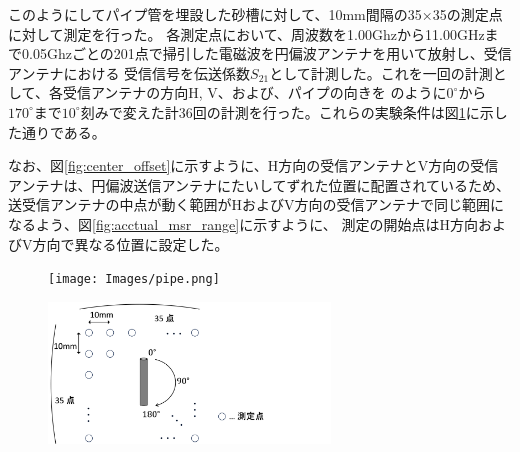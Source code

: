 \documentclass[11pt,a4paper,uplatex]{ujarticle}
\begin{document}
  このようにしてパイプ管を埋設した砂槽に対して、10mm間隔の35×35の測定点に対して測定を行った。
  各測定点において、周波数を1.00Ghzから11.00GHzまで0.05Ghzごとの201点で掃引した電磁波を円偏波アンテナを用いて放射し、受信アンテナにおける
  受信信号を伝送係数$S_{21}$として計測した。これを一回の計測として、各受信アンテナの方向H, V、および、パイプの向きを
  のように$0^{\circ}$から$170^{\circ}$まで$10^{\circ}$刻みで変えた計36回の計測を行った。これらの実験条件は図\ref{fig:msr_cond}に示した通りである。

  なお、図\ref{fig:center_offset}に示すように、H方向の受信アンテナとV方向の受信アンテナは、円偏波送信アンテナにたいしてずれた位置に配置されているため、
  送受信アンテナの中点が動く範囲がHおよびV方向の受信アンテナで同じ範囲になるよう、図\ref{fig:acctual_msr_range}に示すように、
  測定の開始点はH方向およびV方向で異なる位置に設定した。


  \begin{figure}[tbp]
    \begin{minipage}[b]{0.5\textwidth}
      \centering
      \texttt{[image: Images/pipe.png]}
      \label{fig:pipe}
    \end{minipage}
    \begin{minipage}[b]{0.5\textwidth}
      \centering
      \includegraphics[keepaspectratio, width=75mm]{Images/msr_cond.png}
      \label{fig:msr_cond}
    \end{minipage}
  \end{figure}
\end{document}
